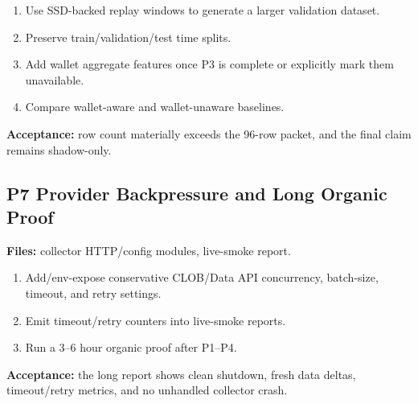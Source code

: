 \documentclass{article}
\begin{document}
\begin{enumerate}[nosep]
\item Use SSD-backed replay windows to generate a larger validation dataset.
\item Preserve train/validation/test time splits.
\item Add wallet aggregate features once P3 is complete or explicitly mark them unavailable.
\item Compare wallet-aware and wallet-unaware baselines.
\end{enumerate}

\textbf{Acceptance:} row count materially exceeds the 96-row packet, and the final claim remains shadow-only.

\subsection*{P7 Provider Backpressure and Long Organic Proof}
\textbf{Files:} collector HTTP/config modules, live-smoke report.

\begin{enumerate}[nosep]
\item Add/env-expose conservative CLOB/Data API concurrency, batch-size, timeout, and retry settings.
\item Emit timeout/retry counters into live-smoke reports.
\item Run a 3--6 hour organic proof after P1--P4.
\end{enumerate}

\textbf{Acceptance:} the long report shows clean shutdown, fresh data deltas, timeout/retry metrics, and no unhandled collector crash.
\end{document}
